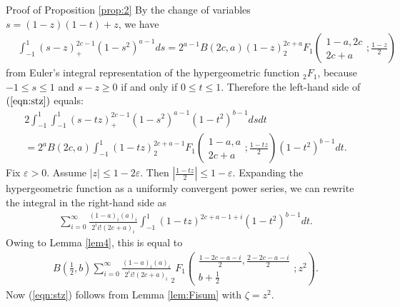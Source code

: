 \documentclass{svjour3}
\newenvironment{proof*}[1]{\noindent\textbf{#1\ }}{\hspace*{\fill}$\Box$\medskip}
\begin{document}
\begin{proof*}{Proof of Proposition \ref{prop:2}}
  By the change of variables $s = (1 - z) (1 - t) + z$, we have
  \begin{eqnarray}
    & \int_{- 1}^1 (s - z)_+^{2 c - 1} (1 - s^2)^{a - 1} d s = 2^{a - 1} B (2
    c, a) (1 - z)^{2 c + a} _2 F_1 \left( \begin{array}{c}
      1 - a, 2 c\\
      2 c + a
    \end{array} ; \frac{1 - z}{2} \right) &  \nonumber
  \end{eqnarray}
  from Euler's integral representation of the hypergeometric function $_2
  F_1$, because $- 1 \leqslant s \leqslant 1$ and $s - z \geqslant 0$ if and
  only if $0 \leqslant t \leqslant 1$. Therefore the left-hand side of
  $(\ref{eqn:stz})$ equals:
  \begin{eqnarray}
    & 2 \int_{- 1}^1 \int_{- 1}^1 (s - t z)_+^{2 c - 1} (1 - s^2)^{a - 1} (1
    - t^2)^{b - 1} d s d t &  \nonumber\\
    & = 2^a B (2 c, a) \int_{- 1}^1 (1 - t z)^{2 c + a - 1} _2 F_1 \left(
    \begin{array}{c}
      1 - a, a\\
      2 c + a
    \end{array} ; \frac{1 - t z}{2} \right) (1 - t^2)^{b - 1} d t. & 
    \nonumber
  \end{eqnarray}
  Fix $\varepsilon > 0$. Assume $| z | \leqslant 1 - 2 \varepsilon$. Then
  $\left| \frac{1 - t z}{2} \right| \leqslant 1 - \varepsilon$. Expanding the
  hypergeometric function as a uniformly convergent power series, we can
  rewrite the integral in the right-hand side as
  \begin{eqnarray}
    & \sum_{i = 0}^{\infty} \frac{(1 - a)_i (a)_i}{2^i i! (2 c + a)_i}
    \int_{- 1}^1 (1 - t z)^{2 c + a - 1 + i} (1 - t^2)^{b - 1} d t. & 
    \nonumber
  \end{eqnarray}
  Owing to Lemma \ref{lem4}, this is equal to
  \begin{eqnarray}
    & B \left( \frac{1}{2}, b \right) \sum_{i = 0}^{\infty} \frac{(1 - a)_i
    (a)_i}{2^i i! (2 c + a)_i} _2 F_1 \left( \begin{array}{c}
      \frac{1 - 2 c - a - i}{2}, \frac{2 - 2 c - a - i}{2}\\
      b + \frac{1}{2}
    \end{array} ; z^2 \right) . &  \nonumber
  \end{eqnarray}
  Now (\ref{eqn:stz}) follows from Lemma \ref{lem:Fisum} with $\zeta = z^2$.
\end{proof*}
\end{document}

